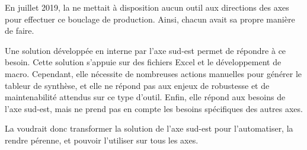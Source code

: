 En juillet 2019, la \sncf ne mettait à disposition aucun outil aux directions des axes pour effectuer ce bouclage de production. Ainsi, chacun avait sa propre manière de faire.

Une solution développée en interne par l'axe sud-est permet de répondre à ce besoin.
Cette solution s'appuie sur des fichiers Excel et le développement de macro.
Cependant, elle nécessite de nombreuses actions manuelles pour générer le tableur de synthèse, et elle ne répond pas aux enjeux de robustesse et de maintenabilité attendus sur ce type d'outil.
Enfin, elle répond aux besoins de l'axe sud-est, mais ne prend pas en compte les besoins spécifiques des autres axes.

La \sncf voudrait donc transformer la solution de l'axe sud-est pour l'automatiser, la rendre pérenne, et pouvoir l'utiliser sur tous les axes.






